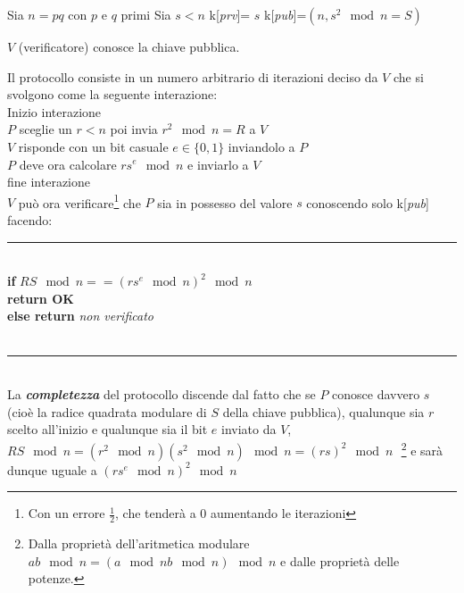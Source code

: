 \documentclass{article}
\begin{document}
Sia $n=pq$ con $p$ e $q$ primi
Sia $s<n$
k[\textit{prv}]= $s$
k[\textit{pub}]=$(n,s^2\mod n = S)$

$V$ (verificatore) conosce la chiave pubblica.

Il protocollo consiste in un numero arbitrario di iterazioni deciso da $V$ che si svolgono come la seguente interazione:\\

Inizio interazione\\
$P$ sceglie un $r<n$ poi invia ${r^2\mod n = R}$ a $ V$\\
$V$ risponde con un bit casuale $e\in \{0,1\}$ inviandolo a $P$\\
$P$ deve ora calcolare $r s^e \mod n$ e inviarlo a $V$\\
fine interazione\\

$V$ può ora verificare\footnote{Con un errore $\frac{1}{2}$, che tenderà a $0$ aumentando le iterazioni} che $P$ sia in possesso del valore $s$ conoscendo solo k[\textit{pub}] facendo:\\
\hrule
\ \\
\textbf{if} $R S \mod n == (r s^e \mod n)^2 \mod n$\\
\indent\indent \textbf{return OK}\\
\textbf{else return} \textit{non verificato}\\
\ \\
\hrule
\ \\

La \textbf{\textit{completezza}} del protocollo discende dal fatto che se $P$ conosce davvero $s$ (cioè la radice quadrata modulare di $S$ della chiave pubblica), qualunque sia $r$ scelto all'inizio e qualunque sia il bit $e$ inviato da $V$, $R S \mod n = (r^2 \mod n)(s^2\mod n)\mod n= (rs)^2\mod n$\ \,\footnote{Dalla proprietà dell'aritmetica modulare $ab\mod n=(a\mod n b\mod n)\mod n$ e dalle proprietà delle potenze.} e sarà dunque uguale a $ (r s^e \mod n)^2 \mod n$
\end{document}
